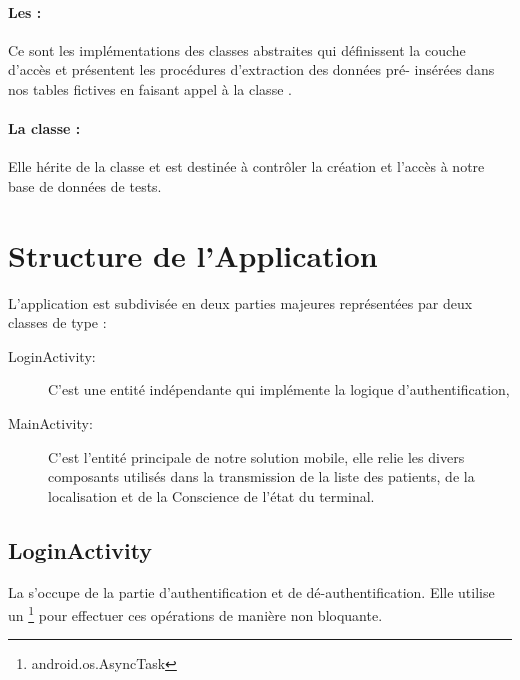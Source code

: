 \paragraph{Les :} 

Ce sont les implémentations des classes abstraites qui définissent la
couche d’accès et présentent les procédures d'extraction des données pré-
insérées dans nos tables fictives en faisant appel à la classe
 .

\paragraph[La classe \dev{DBSetup}:]{La classe :} 

Elle hérite de la classe  et est destinée à
contrôler la création et l’accès à notre base de données de tests.

\section{Structure de l'Application}

L'application est subdivisée en deux parties majeures représentées par deux classes de type  :

\begin{description}

\item [LoginActivity:] C'est une entité indépendante qui implémente la logique d'authentification, 

\item [MainActivity:] C'est l'entité principale de notre solution mobile, elle relie les divers composants utilisés dans la transmission de la liste des patients, de la localisation et de la Conscience de l'état du terminal.

\end{description}

\subsection{LoginActivity}

La  s'occupe de la partie d'authentification et de dé-authentification. Elle utilise un \footnote{android.os.AsyncTask} pour effectuer ces opérations de manière non bloquante.

